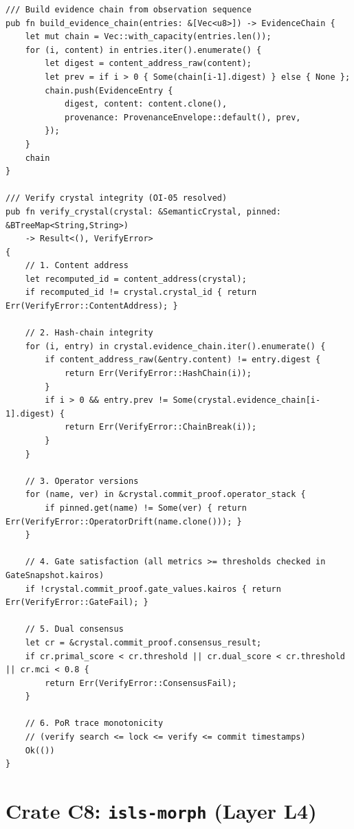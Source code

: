 \documentclass[10pt,a4paper]{article}
\theoremstyle{definition}\newtheorem{definition}{Def}[section]
\theoremstyle{plain}\newtheorem{theorem}{Thm}[section]
\newcommand{\crate}[1]{\texttt{\small\color{rustborder!80!black}#1}}
\begin{document}
\begin{lstlisting}[style=rust]
/// Build evidence chain from observation sequence
pub fn build_evidence_chain(entries: &[Vec<u8>]) -> EvidenceChain {
    let mut chain = Vec::with_capacity(entries.len());
    for (i, content) in entries.iter().enumerate() {
        let digest = content_address_raw(content);
        let prev = if i > 0 { Some(chain[i-1].digest) } else { None };
        chain.push(EvidenceEntry {
            digest, content: content.clone(),
            provenance: ProvenanceEnvelope::default(), prev,
        });
    }
    chain
}

/// Verify crystal integrity (OI-05 resolved)
pub fn verify_crystal(crystal: &SemanticCrystal, pinned: &BTreeMap<String,String>)
    -> Result<(), VerifyError>
{
    // 1. Content address
    let recomputed_id = content_address(crystal);
    if recomputed_id != crystal.crystal_id { return Err(VerifyError::ContentAddress); }

    // 2. Hash-chain integrity
    for (i, entry) in crystal.evidence_chain.iter().enumerate() {
        if content_address_raw(&entry.content) != entry.digest {
            return Err(VerifyError::HashChain(i));
        }
        if i > 0 && entry.prev != Some(crystal.evidence_chain[i-1].digest) {
            return Err(VerifyError::ChainBreak(i));
        }
    }

    // 3. Operator versions
    for (name, ver) in &crystal.commit_proof.operator_stack {
        if pinned.get(name) != Some(ver) { return Err(VerifyError::OperatorDrift(name.clone())); }
    }

    // 4. Gate satisfaction (all metrics >= thresholds checked in GateSnapshot.kairos)
    if !crystal.commit_proof.gate_values.kairos { return Err(VerifyError::GateFail); }

    // 5. Dual consensus
    let cr = &crystal.commit_proof.consensus_result;
    if cr.primal_score < cr.threshold || cr.dual_score < cr.threshold || cr.mci < 0.8 {
        return Err(VerifyError::ConsensusFail);
    }

    // 6. PoR trace monotonicity
    // (verify search <= lock <= verify <= commit timestamps)
    Ok(())
}
\end{lstlisting}

\section{Crate C8: \crate{isls-morph} (Layer L4)}
\label{sec:c8}
\end{document}
